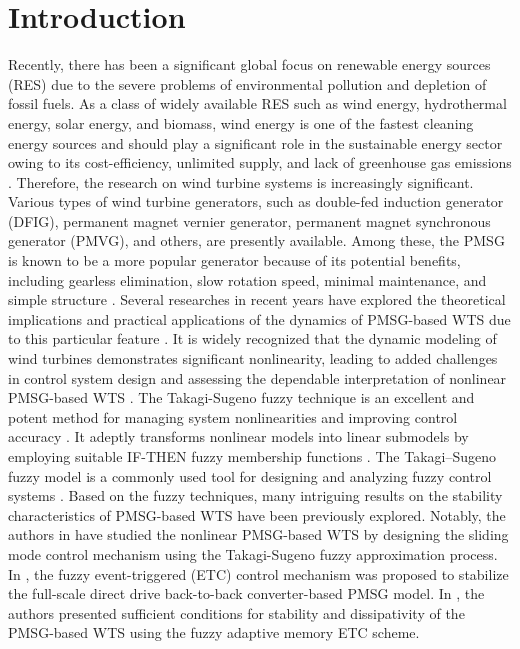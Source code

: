 \documentclass[preprint,11pt]{elsarticle}
\begin{document}
\section{Introduction}
{Recently, there has been a significant global focus on renewable energy sources (RES) due to the severe problems of environmental pollution and depletion of fossil fuels.} As a class of widely available RES such as wind energy, hydrothermal energy, solar energy, and biomass, wind energy is one of the fastest cleaning energy sources and should play a significant role in the sustainable energy sector owing to its cost-efficiency, unlimited supply, and lack of greenhouse gas emissions \cite{wind1,wind3,wind2}. Therefore, the research on wind turbine systems is increasingly significant. Various types of wind turbine generators, such as double-fed induction generator (DFIG), permanent magnet vernier generator, permanent magnet synchronous generator (PMVG), and others, are {presently} available. Among these, the PMSG is known to be a more popular generator because of its potential benefits, including gearless elimination, slow rotation speed, minimal maintenance, and simple structure \cite{wind4}. Several researches in recent years have explored the theoretical implications and practical applications of the dynamics of PMSG-based WTS due to this particular feature
\cite{wind5,wind6,wind7}. It is widely recognized that the dynamic modeling of wind turbines demonstrates significant nonlinearity, leading to added challenges in control system design and assessing the dependable interpretation of nonlinear PMSG-based WTS \cite{wind8}. The {Takagi-Sugeno} fuzzy technique is an excellent and potent method for managing system nonlinearities and improving control accuracy \cite{EDI-1,EDI-2,EDI-3}. It adeptly transforms nonlinear models into linear submodels by employing suitable {IF-THEN fuzzy membership functions} \cite{fuzzy1}. {The Takagi–Sugeno fuzzy model is a commonly used tool for designing and analyzing fuzzy control systems \cite{R3-1,R3-2,R3-3}.} Based on the fuzzy techniques, many intriguing results on the stability {characteristics of PMSG-based WTS have been previously explored.} Notably, the authors in \cite{fuzzy0} have studied the nonlinear PMSG-based WTS by designing the sliding mode control mechanism using the {Takagi-Sugeno} fuzzy approximation process. In \cite{fuzzy2}, the fuzzy event-triggered (ETC) control mechanism was proposed to stabilize the full-scale direct drive back-to-back converter-based PMSG model. {In \cite{fuzzy3}, the authors presented sufficient conditions for stability and dissipativity of the PMSG-based WTS using the fuzzy adaptive memory ETC scheme.}
\end{document}
